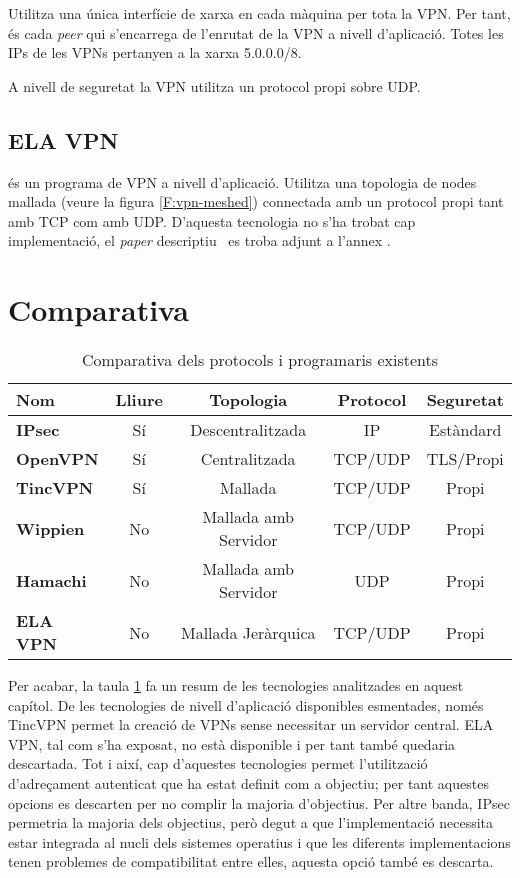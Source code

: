 Utilitza una única interfície de xarxa en cada màquina per tota la VPN. Per tant, és cada \emph{peer} qui s'encarrega de l'enrutat de la VPN a nivell d'aplicació. Totes les IPs de les VPNs pertanyen a la xarxa 5.0.0.0/8.

A nivell de seguretat la VPN utilitza un protocol propi sobre UDP.

\subsection{ELA VPN}
 és un programa de VPN a nivell d'aplicació.
Utilitza una topologia de nodes mallada (veure la figura \ref{F:vpn-meshed}) connectada amb un protocol propi tant amb TCP com amb UDP.
D'aquesta tecnologia no s'ha trobat cap implementació, el \emph{paper} descriptiu~\cite{ela} es troba adjunt a l'annex .

\section{Comparativa}
\begin{table}[htb]
\begin{center}
\begin{tabular}{|l|c|c|c|c|}
\hline
Nom & Lliure & Topologia & Protocol & Seguretat \\ \hline \hline
\bf IPsec & Sí & Descentralitzada & IP & Estàndard \\ \hline
\bf OpenVPN & Sí & Centralitzada & TCP/UDP & TLS/Propi \\ \hline
\bf TincVPN & Sí & Mallada & TCP/UDP & Propi \\ \hline
\bf Wippien & No & Mallada amb Servidor & TCP/UDP & Propi \\ \hline
\bf Hamachi & No & Mallada amb Servidor & UDP & Propi \\ \hline
\bf ELA VPN & No & Mallada Jeràrquica & TCP/UDP & Propi \\ \hline
\end{tabular}
\end{center}
\begin{center}
\caption{Comparativa dels protocols i programaris existents}
\label{T:statecomp}
\end{center}
\end{table}
Per acabar, la taula \ref{T:statecomp} fa un resum de les tecnologies analitzades en aquest capítol. De les tecnologies de nivell d'aplicació disponibles esmentades, només TincVPN permet la creació de VPNs sense necessitar un servidor central. ELA VPN, tal com s'ha exposat, no està disponible i per tant també quedaria descartada. Tot i així, cap d'aquestes tecnologies permet l'utilització d'adreçament autenticat que ha estat definit com a objectiu; per tant aquestes opcions es descarten per no complir la majoria d'objectius.
Per altre banda, IPsec permetria la majoria dels objectius, però degut a que l'implementació necessita estar integrada al nucli dels sistemes operatius i que les diferents implementacions tenen problemes de compatibilitat entre elles, aquesta opció també es descarta.
